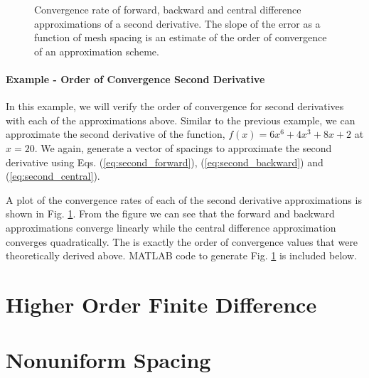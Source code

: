 \begin{figure}[t]
\sidecaption[t]
\scalebox{0.5}{}
\caption{Convergence rate of forward, backward and central difference approximations of  a second derivative. The slope of the error as a function of mesh spacing is an estimate of the order of convergence of an approximation scheme.}
\label{fig:fdm_approx_2}
\end{figure}

\paragraph{Example - Order of Convergence Second Derivative}

In this example, we will verify the order of convergence for second derivatives with each of the approximations above. 
Similar to the previous example, we can approximate the second derivative of the function, $f\left(x\right) = 6x^{6} + 
4x^{3} + 8x + 2$  at $x=20$.  We again, generate a vector of spacings to approximate the second derivative using Eqs.
(\ref{eq:second_forward}), (\ref{eq:second_backward}) and (\ref{eq:second_central}).
\par
A plot of the convergence rates of each of the second derivative approximations is shown in Fig. \ref{fig:fdm_approx_2}.
From the figure we can see that the forward and backward approximations converge linearly while the central difference
approximation converges quadratically.  The is exactly the order of convergence values that were theoretically derived
above.  MATLAB code to generate Fig. \ref{fig:fdm_approx_2} is included below.


\section{Higher Order Finite Difference}

\section{Nonuniform Spacing}
\label{subsec:fdm_nonuniform}

